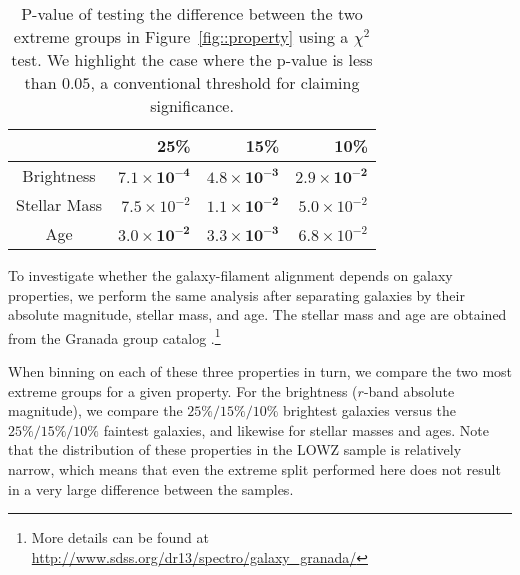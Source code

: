 \documentclass[usenatbib,useAMS]{mnras}
\theoremstyle{remark}
\newcommand{\peter}[1]{{\textcolor{green}{PM: #1}}}
\newcommand{\rachel}[1]{{\textcolor{cyan}{RM: #1}}}
\newcommand{\jab}[1]{{\textcolor{red}{JAB: #1}}}
\newcommand{\YC}[1]{{\textcolor{blue}{YC: #1}}}
\begin{document}
{\begin{table}
\centering
\begin{tabular}{crrr}
  \hline
 & 25\% & 15\% & 10\% \\ 
  \hline
Brightness & $\mathbf{7.1\times 10^{-4}}$ & $\mathbf{4.8\times 10^{-3}}$  & $\mathbf{2.9\times 10^{-2}}$  \\ 
Stellar Mass & $7.5\times 10^{-2}$  & $\mathbf{1.1\times10^{-2}}$  & $5.0\times10^{-2}$  \\ 
  Age & $\mathbf{3.0\times10^{-2}}$  & $\mathbf{3.3\times10^{-3}}$  & ${6.8\times10^{-2}}$  \\ 
   \hline
\end{tabular}
\caption{P-value of testing the difference between the two extreme groups in Figure~\ref{fig::property}
using a $\chi^2$ test.
We highlight the case where the p-value is less than $0.05$, a conventional threshold
for claiming significance. 
}
\label{tab::test1}

\end{table}

To investigate whether the galaxy-filament alignment depends on galaxy properties, 
we perform the same analysis after separating galaxies 
by their absolute magnitude,
stellar mass, and age. 
The stellar mass and age are obtained from the Granada group catalog
\citep{2014ApJS..211...17A}.\footnote{
More details can be found at \url{http://www.sdss.org/dr13/spectro/galaxy_granada/}}

When binning on each of these three properties in turn, we compare the two most extreme groups for a
given property. 
For the brightness ($r$-band absolute magnitude), we compare the $25\%/15\%/10\%$ brightest galaxies versus the $25\%/15\%/10\%$ faintest galaxies, and 
likewise for stellar masses and ages.
Note that the distribution of these properties in the LOWZ sample is relatively narrow, which means
that even the extreme split performed here does not result in a very large difference between the samples. 


}
\end{document}

